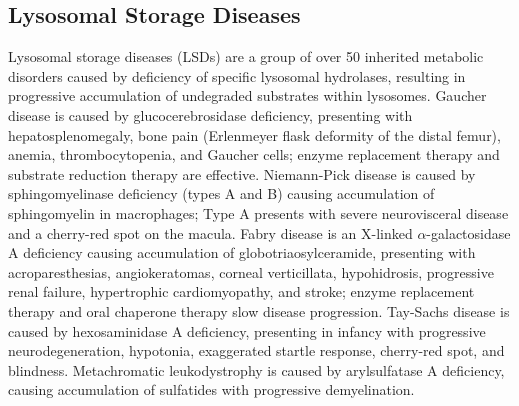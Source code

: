 \subsection{Lysosomal Storage Diseases}
\label{sec:Lysosomal Storage Diseases}
Lysosomal storage diseases (LSDs) are a group of over 50 inherited metabolic disorders caused by deficiency of specific lysosomal hydrolases, resulting in progressive accumulation of undegraded substrates within lysosomes. Gaucher disease is caused by glucocerebrosidase deficiency, presenting with hepatosplenomegaly, bone pain (Erlenmeyer flask deformity of the distal femur), anemia, thrombocytopenia, and Gaucher cells; enzyme replacement therapy and substrate reduction therapy are effective. Niemann-Pick disease is caused by sphingomyelinase deficiency (types A and B) causing accumulation of sphingomyelin in macrophages; Type A presents with severe neurovisceral disease and a cherry-red spot on the macula. Fabry disease is an X-linked $\alpha$-galactosidase A deficiency causing accumulation of globotriaosylceramide, presenting with acroparesthesias, angiokeratomas, corneal verticillata, hypohidrosis, progressive renal failure, hypertrophic cardiomyopathy, and stroke; enzyme replacement therapy and oral chaperone therapy slow disease progression. Tay-Sachs disease is caused by hexosaminidase A deficiency, presenting in infancy with progressive neurodegeneration, hypotonia, exaggerated startle response, cherry-red spot, and blindness. Metachromatic leukodystrophy is caused by arylsulfatase A deficiency, causing accumulation of sulfatides with progressive demyelination.

